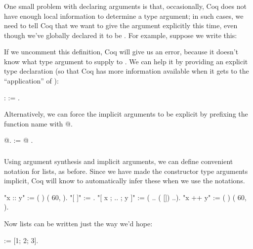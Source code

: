 \documentclass[12pt]{report}
\begin{document}
\subsubsection{ }



 One small problem with declaring arguments  is
    that, occasionally, Coq does not have enough local information to
    determine a type argument; in such cases, we need to tell Coq that
    we want to give the argument explicitly this time, even though
    we've globally declared it to be .  For example, suppose we
    write this: \begin{coqdoccode}
\coqdocemptyline
\coqdocemptyline
\end{coqdoccode}
If we uncomment this definition, Coq will give us an error,
    because it doesn't know what type argument to supply to .  We
    can help it by providing an explicit type declaration (so that Coq
    has more information available when it gets to the ``application''
    of ): \begin{coqdoccode}
\coqdocemptyline
\coqdocnoindent
{}  :   := .\coqdoceol
\coqdocemptyline
\end{coqdoccode}
Alternatively, we can force the implicit arguments to be explicit by
   prefixing the function name with @. \begin{coqdoccode}
\coqdocemptyline
\coqdocnoindent
{} @.\coqdoceol
\coqdocemptyline
\coqdocnoindent
{}  := @ .\coqdoceol
\coqdocemptyline
\end{coqdoccode}
\subsubsection{ }

 Using argument synthesis and implicit arguments, we can
    define convenient notation for lists, as before.  Since we have
    made the constructor type arguments implicit, Coq will know to
    automatically infer these when we use the notations. \begin{coqdoccode}
\coqdocemptyline
\coqdocnoindent
{} "x :: y" := (  )\coqdoceol
\coqdocindent{10.50em}
(  60,  ).\coqdoceol
\coqdocnoindent
{} "[ ]" := .\coqdoceol
\coqdocnoindent
{} "[ x ; .. ; y ]" := (  .. (  []) ..).\coqdoceol
\coqdocnoindent
{} "x ++ y" := (  )\coqdoceol
\coqdocindent{10.50em}
(  60,  ).\coqdoceol
\coqdocemptyline
\end{coqdoccode}
Now lists can be written just the way we'd hope: \begin{coqdoccode}
\coqdocemptyline
\coqdocnoindent
{}  := [1; 2; 3].\coqdoceol
\coqdocemptyline
\end{coqdoccode}
\end{document}
